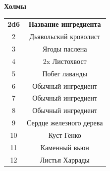\documentclass[a4paper, 9pt, twocolumn]{book}
\begin{document}
	\begin{table}[H]
		
		{\Large \textbf{Холмы}}
		
		\medspace 
		
		\centering 
		
		\begin{tabularx}{\linewidth}{c C}
			
			\textbf{2d6} & \textbf{Название ингредиента} \\
			
			2 & Дьявольский кроволист  \\
			
			3 & Ягоды паслена  \\
			
			4 & 2x Листохвост \\
			
			5 & Побег лаванды  \\
			
			6 & Обычный ингредиент \\
			
			7 & Обычный ингредиент \\
			
			8 & Обычный ингредиент \\
			
			9 & Сердце железного дерева  \\
			
			10 & Куст Генко  \\
			
			11 & Каменный вьюн  \\
			
			12 & Листья Харрады
		\end{tabularx}
	\end{table}
\end{document}
